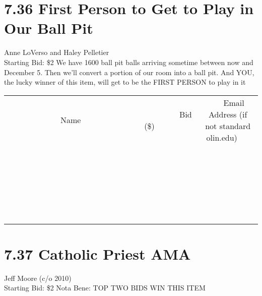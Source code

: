 \documentclass[11pt]{article}
\begin{document}
\section*{7.36 First Person to Get to Play in Our Ball Pit}
Anne LoVerso and Haley Pelletier
\\
Starting Bid: \$2
\newline
We have 1600 ball pit balls arriving sometime between now and December 5.  Then we'll convert a portion of our room into a ball pit.  And YOU, the lucky winner of this item, will get to be the FIRST PERSON to play in it
\\[6ex]
\begin{tabular}{c c c}
~~~~~~~~~~~~~Name~~~~~~~~~~~~~ & ~~~~~~~~~Bid (\$)~~~~~~~~~  & ~~~Email Address (if not standard olin.edu)~~~\\
 & & \\
\hline
 & & \\
\hline
 & & \\
\hline
 & & \\
\hline
 & & \\
\hline
 & & \\
\hline
 & & \\
\hline
 & & \\
\hline
 & & \\
\hline
 & & \\
\hline
 & & \\
\hline
 & & \\
\hline
 & & \\
\hline
 & & \\
\hline
 & & \\
\hline
 & & \\
\hline
 & & \\
\hline
 & & \\
\hline
 & & \\
\hline
 & & \\
\hline
 & & \\
\hline
 & & \\
\hline
 & & \\
\hline
 & & \\
\hline
 & & \\
\hline
 & & \\
\hline
\end{tabular}
\newpage
\section*{7.37 Catholic Priest AMA}
Jeff Moore (c/o 2010)
\\
Starting Bid: \$2
\newline
Nota Bene: TOP TWO BIDS WIN THIS ITEM
\end{document}
